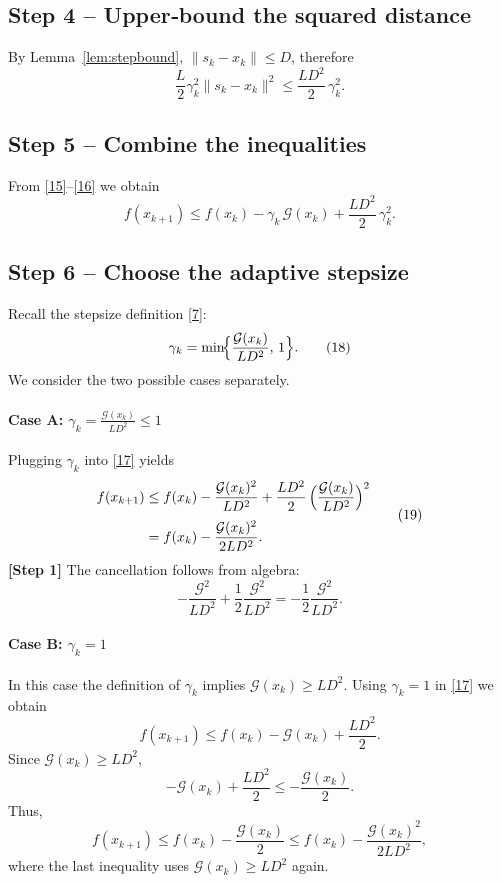 \documentclass[11pt]{article}
\begin{document}
\subsection*{Step 4 – Upper‑bound the squared distance}
By Lemma~\ref{lem:stepbound}, $\|s_{k}-x_{k}\|\le D$, therefore
\[
\frac{L}{2}\gamma_{k}^{2}\|s_{k}-x_{k}\|^{2}
   \le \frac{L D^{2}}{2}\,\gamma_{k}^{2}.
\tag{16}
\]

\subsection*{Step 5 – Combine the inequalities}
From \eqref{15}–\eqref{16} we obtain
\[
f(x_{k+1}) \le f(x_{k}) - \gamma_{k}\,\mathcal G(x_{k})
               + \frac{L D^{2}}{2}\,\gamma_{k}^{2}.
\tag{17}
\]

\subsection*{Step 6 – Choose the adaptive stepsize}
Recall the stepsize definition \eqref{7}:
\[
\gamma_{k}= \min\!\Bigl\{\frac{\mathcal G(x_{k})}{L D^{2}},\,1\Bigr\}.
\tag{18}
\]
We consider the two possible cases separately.

\paragraph{Case A: $\displaystyle \gamma_{k}= \frac{\mathcal G(x_{k})}{L D^{2}}\le 1$}
Plugging $\gamma_{k}$ into \eqref{17} yields
\[
\begin{aligned}
f(x_{k+1})
&\le f(x_{k})
   - \frac{\mathcal G(x_{k})^{2}}{L D^{2}}
   + \frac{L D^{2}}{2}\,\Bigl(\frac{\mathcal G(x_{k})}{L D^{2}}\Bigr)^{2} \\[1mm]
&= f(x_{k}) - \frac{\mathcal G(x_{k})^{2}}{2 L D^{2}} .
\end{aligned}
\tag{19}
\]
\textbf{[Step 1]} The cancellation follows from algebra:
\[
-\frac{\mathcal G^{2}}{L D^{2}}+\frac{1}{2}\frac{\mathcal G^{2}}{L D^{2}}
= -\frac{1}{2}\frac{\mathcal G^{2}}{L D^{2}} .
\]

\paragraph{Case B: $\displaystyle \gamma_{k}=1$}
In this case the definition of $\gamma_{k}$ implies
$\mathcal G(x_{k})\ge L D^{2}$.  Using $\gamma_{k}=1$ in \eqref{17} we obtain
\[
f(x_{k+1}) \le f(x_{k}) - \mathcal G(x_{k}) + \frac{L D^{2}}{2}.
\tag{20}
\]
Since $\mathcal G(x_{k})\ge L D^{2}$,
\[
-\mathcal G(x_{k}) + \frac{L D^{2}}{2}
\le -\frac{\mathcal G(x_{k})}{2}.
\tag{21}
\]
Thus,
\[
f(x_{k+1}) \le f(x_{k}) - \frac{\mathcal G(x_{k})}{2}
           \le f(x_{k}) - \frac{\mathcal G(x_{k})^{2}}{2 L D^{2}},
\tag{22}
\]
where the last inequality uses $\mathcal G(x_{k})\ge L D^{2}$ again.
\end{document}
